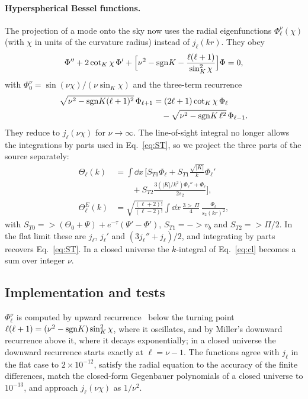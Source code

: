 \paragraph*{Hyperspherical Bessel functions.} The projection of a mode onto the sky now uses the radial
eigenfunctions $\Phi^\nu_\ell(\chi)$ (with $\chi$ in units of the curvature radius) instead of $j_\ell(kr)$. They obey
\begin{equation}
\Phi''+2\cot_K\chi\,\Phi'+\Big[\nu^2-{\rm sgn}K-\frac{\ell(\ell+1)}{\sin_K^2\chi}\Big]\Phi=0,
\end{equation}
with $\Phi^\nu_0=\sin(\nu\chi)/(\nu\sin_K\chi)$ and the three-term recurrence
\begin{align}
\sqrt{\nu^2-{\rm sgn}K(\ell+1)^2}\,\Phi_{\ell+1} &= (2\ell+1)\cot_K\chi\,\Phi_\ell \nonumber\\
 &\quad -\sqrt{\nu^2-{\rm sgn}K\,\ell^2}\,\Phi_{\ell-1}.
\end{align}
They reduce to $j_\ell(\nu\chi)$ for $\nu\to\infty$. The line-of-sight integral no longer allows the integrations by
parts used in Eq.~\eqref{eq:ST}, so we project the three parts of the source separately:
\begin{align}
\Theta_\ell(k) &= \int\dd x\,\Big[S_{T0}\Phi_\ell + S_{T1}\frac{\sqrt{|K|}}{k}\Phi_\ell' \nonumber\\
 &\qquad + S_{T2}\frac{3(|K|/k^2)\Phi_\ell''+\Phi_\ell}{2s_2}\Big],\\
\Theta^E_\ell(k) &= \sqrt{\tfrac{(\ell+2)!}{(\ell-2)!}}\int\dd x\,\frac{3\gt\,\Pi}{4}\,\frac{\Phi_\ell}{s_2(kr)^2},
\end{align}
with $S_{T0}=\gt(\Theta_0+\Psi)+e^{-\tau}(\Psi'-\Phi')$, $S_{T1}=-\gt v_b$ and $S_{T2}=\gt\Pi/2$. In the flat limit
these are $j_\ell$, $j_\ell'$ and $(3j_\ell''+j_\ell)/2$, and integrating by parts recovers Eq.~\eqref{eq:ST}. In a
closed universe the $k$-integral of Eq.~\eqref{eq:cl} becomes a sum over integer $\nu$.

\subsection{Implementation and tests}

$\Phi^\nu_\ell$ is computed by upward recurrence~\cite{Kosowsky1998,Tram2017} below the turning point
$\ell(\ell+1)=(\nu^2-{\rm sgn}K)\sin_K^2\chi$, where it oscillates, and by Miller's downward recurrence above it, where
it decays exponentially; in a closed universe the downward recurrence starts exactly at $\ell=\nu-1$. The functions
agree with $j_\ell$ in the flat case to $2\times10^{-12}$, satisfy the radial equation to the accuracy of the finite
differences, match the closed-form Gegenbauer polynomials of a closed universe to $10^{-13}$, and approach
$j_\ell(\nu\chi)$ as $1/\nu^2$.

